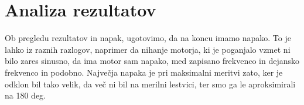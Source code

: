 \section{Analiza rezultatov}\label{sec:zakljucek}

Ob pregledu rezultatov in napak, ugotovimo, da na koncu imamo napako. To je lahko iz raznih razlogov, naprimer da nihanje motorja, ki je poganjalo vzmet ni bilo zares sinusno, da ima motor sam napako, med zapisano frekvenco in dejansko frekvenco in podobno. Največja napaka je pri maksimalni meritvi zato, ker je odklon bil tako velik, da več ni bil na merilni lestvici, ter smo ga le aproksimirali na 180 deg.



